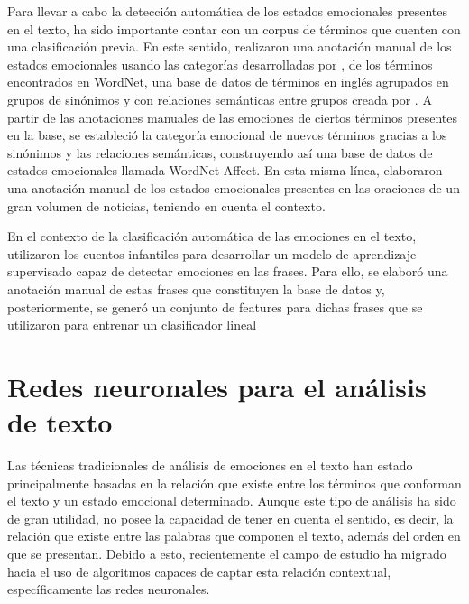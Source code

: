 Para llevar a cabo la detección automática de los estados emocionales presentes en el texto, ha sido importante contar con un corpus de términos que cuenten con una clasificación previa. En este sentido, \cite{strapparava2004wordnet} realizaron una anotación manual de los estados emocionales usando las categorías desarrolladas por \cite{ortony1987referential}, de los términos encontrados en WordNet, una base de datos de términos en inglés agrupados en grupos de sinónimos y con relaciones semánticas entre grupos creada por \cite{miller1995wordnet}. A partir de las anotaciones manuales de las emociones de ciertos términos presentes en la base, se estableció la categoría emocional de nuevos términos gracias a los sinónimos y las relaciones semánticas, construyendo así una base de datos de estados emocionales llamada WordNet-Affect. En esta misma línea, \cite{wiebe2005annotating} elaboraron una anotación manual de los estados emocionales presentes en las oraciones de un gran volumen de noticias, teniendo en cuenta el contexto.

En el contexto de la clasificación automática de las emociones en el texto, \cite{alm2005emotions} utilizaron los cuentos infantiles para desarrollar un modelo de aprendizaje supervisado capaz de detectar emociones en las frases. Para ello, se elaboró una anotación manual de estas frases que constituyen la base de datos y, posteriormente, se generó un conjunto de features para dichas frases que se utilizaron para entrenar un clasificador lineal




\section{Redes neuronales para el análisis de texto}

Las técnicas tradicionales de análisis de emociones en el texto han estado principalmente basadas en la relación que existe entre los términos que conforman el texto y un estado emocional determinado. Aunque este tipo de análisis ha sido de gran utilidad, no posee la capacidad de tener en cuenta el sentido, es decir, la relación que existe entre las palabras que componen el texto, además del orden en que se presentan. Debido a esto, recientemente el campo de estudio ha migrado hacia el uso de algoritmos capaces de captar esta relación contextual, específicamente las redes neuronales.

